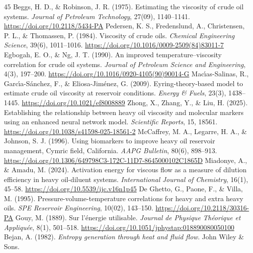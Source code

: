 \documentclass[review,12pt]{elsarticle}
\begin{document}
\begin{thebibliography}{45}
 Beggs, H. D., \& Robinson, J. R. (1975). Estimating the viscosity of crude oil systems. \textit{Journal of Petroleum Technology}, 27(09), 1140--1141. \url{https://doi.org/10.2118/5434-PA}
 Pedersen, K. S., Fredenslund, A., Christensen, P. L., \& Thomassen, P. (1984). Viscosity of crude oils. \textit{Chemical Engineering Science}, 39(6), 1011--1016. \url{https://doi.org/10.1016/0009-2509(84)83011-7}
 Egbogah, E. O., \& Ng, J. T. (1990). An improved temperature--viscosity correlation for crude oil systems. \textit{Journal of Petroleum Science and Engineering}, 4(3), 197--200. \url{https://doi.org/10.1016/0920-4105(90)90014-G}
 Mac{\'\i}as-Salinas, R., Garc{\'\i}a-S{\'a}nchez, F., \& Eliosa-Jim{\'e}nez, G. (2009). Eyring-theory-based model to estimate crude oil viscosity at reservoir conditions. \textit{Energy \& Fuels}, 23(3), 1438--1445. \url{https://doi.org/10.1021/ef8008889}
 Zhong, X., Zhang, Y., \& Liu, H. (2025). Establishing the relationship between heavy oil viscosity and molecular markers using an enhanced neural network model. \textit{Scientific Reports}, 15, 18561. \url{https://doi.org/10.1038/s41598-025-18561-2}
 McCaffrey, M. A., Legarre, H. A., \& Johnson, S. J. (1996). Using biomarkers to improve heavy oil reservoir management, Cymric field, California. \textit{AAPG Bulletin}, 80(6), 898--913. \url{https://doi.org/10.1306/649798C3-172C-11D7-8645000102C1865D}
 Miadonye, A., \& Amadu, M. (2024). Activation energy for viscous flow as a measure of dilution efficiency in heavy oil-diluent systems. \textit{International Journal of Chemistry}, 16(1), 45--58. \url{https://doi.org/10.5539/ijc.v16n1p45}
 De Ghetto, G., Paone, F., \& Villa, M. (1995). Pressure-volume-temperature correlations for heavy and extra heavy oils. \textit{SPE Reservoir Engineering}, 10(02), 143--150. \url{https://doi.org/10.2118/30316-PA}
 Gouy, M. (1889). Sur l'{\'e}nergie utilisable. \textit{Journal de Physique Th{\'e}orique et Appliqu{\'e}e}, 8(1), 501--518. \url{https://doi.org/10.1051/jphystap:018890080050100}
 Bejan, A. (1982). \textit{Entropy generation through heat and fluid flow}. John Wiley \& Sons.

\end{thebibliography}
\end{document}
